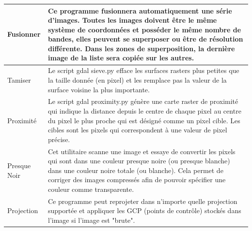 {\begin{longtable}{|p{3cm}|p{13cm}|}
\hline Fusionner & Ce programme fusionnera automatiquement une série d'images. Toutes les images doivent être le même système de coordonnées et posséder le même nombre de bandes, elles peuvent se superposer ou être de résolution différente. Dans les zones de superposition, la dernière image de la liste sera copiée sur les autres.\\
\hline Tamiser & Le script gdal sieve.py efface les surfaces rasters plus petites que la taille donnée (en pixel) et les remplace pas la valeur de la surface voisine la plus importante.\\
\hline Proximité & Le script gdal proximity.py génère une carte raster de proximité qui indique la distance depuis le centre de chaque pixel au centre du pixel le plus proche qui est désigné comme un pixel cible. Les cibles sont les pixels qui correspondent à une valeur de pixel précise.\\
\hline Presque Noir & Cet utilitaire scanne une image et essaye de convertir les pixels qui sont dans une couleur presque noire (ou presque blanche) dans une couleur noire totale (ou blanche). Cela permet de corriger des images compressés afin de pouvoir spécifier une couleur comme transparente.\\
\hline Projection & Ce programme peut reprojeter dans n'importe quelle projection supportée et appliquer les GCP (points de contrôle) stockés dans l'image si l'image est "brute". \\

\end{longtable}}
